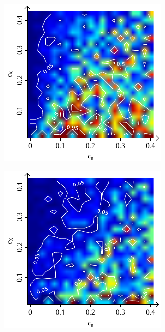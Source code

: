 \documentclass[a4paper, 10pt, twoside, openany]{book} %
\begin{document}
\begin{figure}
\begin{minipage}[t]{0.48\textwidth}
			\includegraphics[width=\textwidth]{Abbildungen/Phasendiagramme/Konturen/H_penalty_cluster_P.pdf}
			\label{H_penalty_cluster_P}
		\end{minipage}
		\begin{minipage}[t]{0.48\textwidth}
			\includegraphics[width=\textwidth]{Abbildungen/Phasendiagramme/Konturen/H_random_P.pdf}

\end{minipage}
\end{figure}
\end{document}
